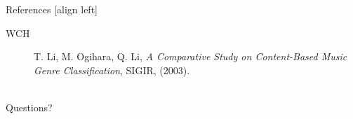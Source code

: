 \documentclass[xcolor=dvipsnames,t]{beamer} %
\begin{document}
\begin{frame}{References}
   [align left] %
   \begin{description}                              %
      \item[WCH] T. Li, M. Ogihara, Q. Li, \emph{A Comparative Study on Content-Based Music Genre Classification}, SIGIR, (2003).\\
   \end{description}
   ~\\
   Questions?

\end{frame}
\end{document}
